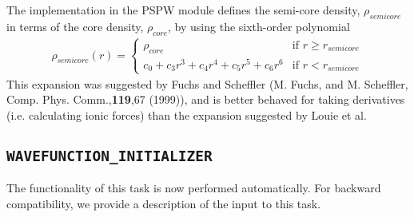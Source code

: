 The implementation in the PSPW module defines the semi-core density, $\rho_{semicore}$ in terms of 
the core density, $\rho_{core}$, by using the sixth-order polynomial
\begin{eqnarray}
\rho_{semicore}(r) = \left\{ \begin{array}{ll}
                              \rho_{core} & \mbox{if $r \geq r_{semicore}$} \\
                              c_0 + c_3 r^3 + c_4 r^4 + c_5 r^5 + c_6 r^6 &  \mbox{if $r < r_{semicore}$}
                            \end{array}
                     \right.
\end{eqnarray}
This expansion was suggested by Fuchs and Scheffler 
(M. Fuchs, and M. Scheffler, Comp. Phys. Comm.,\textbf{119},67 (1999)), 
and is better behaved for taking derivatives (i.e. calculating ionic forces) than the expansion suggested 
by Louie et al.




\subsection{\tt WAVEFUNCTION\_INITIALIZER}
\label{sec:pspw_wavefunction_initializer}
The functionality of this task is now performed automatically. For backward 
compatibility, we provide a description of the input to this task.

